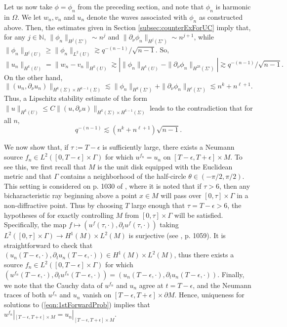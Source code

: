 \documentclass[final,leqno]{siamart1116}
\begin{document}
Let us now take $\phi = \phi_n$ from the preceding section, and note that
$\phi_n$ is harmonic in $\Omega$. We let $w_n,v_n$ and $u_n$ denote the
waves associated with $\phi_n$ as constructed above. Then, the
estimates given in Section \ref{subsec:counterExForUC} imply that, for
any $j \in \mathbb{N}$, $\|\phi_n\|_{H^j(\Sigma')} \sim n^j$ and
$\|{\partial}_\nu \phi_n\|_{H^j(\Sigma')} \sim n^{j+1}$, while
$\|\phi_n\|_{H^j(U)} \geq \|\phi_n\|_{L^2(U)} \gtrsim
q^{-(n-1)}/\sqrt{n-1}$. So,
\begin{equation*}
  \|u_n\|_{H^k(U)} = \|w_n - v_n\|_{H^k(U)} \gtrsim \left|\|\phi_n\|_{H^k(U)} - \|{\partial}_\nu\phi_n\|_{H^{2k}(\Sigma')} \right|  \gtrsim q^{-(n-1)}/\sqrt{n-1}.
\end{equation*}
On the other hand,
\begin{equation*}
  \|(u_n,{\partial}_\nu u_n) \|_{H^k(\Sigma) \times H^{k-1}(\Sigma)} \lesssim
  \|\phi_n\|_{H^k(\Sigma')} + \|{\partial}_\nu \phi_n\|_{H^\ell(\Sigma')} \lesssim n^k + n^{\ell+1}.
\end{equation*}
Thus, a Lipschitz stability estimate of the form $\|u\|_{H^k(U)} \leq C
\|(u,{\partial}_\nu u)\|_{H^k(\Sigma) \times H^{k-1}(\Sigma)}$ leads to the
contradiction that for all $n$,
\begin{equation*}
  q^{-(n -1)} \lesssim (n^k + n^{\ell+1})\sqrt{n-1}.
\end{equation*}
  
We now show that, if $\tau := T-\epsilon$ is sufficiently large, there
exists a Neumann source $f_n \in L^2([0,T-\epsilon] \times \Gamma)$
for which $u^{f_n} = u_n$ on $[T-\epsilon,T+\epsilon] \times M$. To
see this, we first recall that $M$ is the unit disk equipped with the
Euclidean metric and that $\Gamma$ contains a neighborhood of the
half-circle $\theta \in (-\pi/2,\pi/2)$. This setting is considered on
p. 1030 of \cite{Bardos1992}, where it is noted that if $\tau > 6$,
then any bicharacteristic ray beginning above a point $x \in M$ will
pass over $[0,\tau]\times\Gamma$ in a non-diffractive point. Thus by
choosing $T$ large enough that $\tau = T - \epsilon > 6$, the
hypotheses of \cite[Th. 4.9]{Bardos1992} for exactly controlling $M$
from $[0,\tau] \times \Gamma$ will be satisfied. Specifically, the map
$f \mapsto (u^f(\tau,\cdot), {\partial}_t u^f(\tau,\cdot))$ taking
$L^2([0,\tau] \times \Gamma) \rightarrow H^1(M) \times L^2(M)$ is
surjective (see \cite[ex. 2]{Bardos1992}, p. 1059). It is
straightforward to check that $(u_n(T-\epsilon,\cdot), {\partial}_t
u_n(T-\epsilon, \cdot)) \in H^1(M) \times L^2(M)$, thus there exists a
source $f_n \in L^2([0,T-\epsilon] \times \Gamma)$ for which
$(u^{f_n}(T-\epsilon,\cdot), {\partial}_t u^{f_n}(T-\epsilon,\cdot)) =
(u_n(T-\epsilon,\cdot), {\partial}_t u_n(T-\epsilon, \cdot))$. Finally, we
note that the Cauchy data of $u^{f_n}$ and $u_n$ agree at $t =
T-\epsilon$, and the Neumann traces of both $u^{f_n}$ and $u_n$ vanish
on $[T-\epsilon, T+\epsilon] \times {\partial} M$. Hence, uniqueness for
solutions to (\ref{eqn:1stForwardProb}) implies that
$u^{f_n}|_{[T-\epsilon, T+\epsilon] \times M} = u_n|_{[T-\epsilon,
    T+\epsilon] \times M}$.
\end{document}

